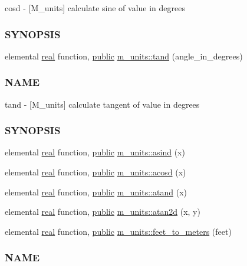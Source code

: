 \begin{DoxyCompactItemize}
\begin{DoxyCompactList}
cosd -\/ \mbox{[}M\+\_\+units\mbox{]} calculate sine of value in degrees \subsubsection*{S\+Y\+N\+O\+P\+S\+IS}\end{DoxyCompactList}\item 
elemental \hyperlink{read__watch_83_8txt_abdb62bde002f38ef75f810d3a905a823}{real} function, \hyperlink{M__stopwatch_83_8txt_a2f74811300c361e53b430611a7d1769f}{public} \hyperlink{namespacem__units_ac2c6550d996061015c6b4178048e4967}{m\+\_\+units\+::tand} (angle\+\_\+in\+\_\+degrees)
\begin{DoxyCompactList}\small\item\em \subsubsection*{N\+A\+ME}

tand -\/ \mbox{[}M\+\_\+units\mbox{]} calculate tangent of value in degrees \subsubsection*{S\+Y\+N\+O\+P\+S\+IS}\end{DoxyCompactList}\item 
elemental \hyperlink{read__watch_83_8txt_abdb62bde002f38ef75f810d3a905a823}{real} function, \hyperlink{M__stopwatch_83_8txt_a2f74811300c361e53b430611a7d1769f}{public} \hyperlink{namespacem__units_ad2b3de1ae68e3090d6c5793fc50dce77}{m\+\_\+units\+::asind} (x)
\item 
elemental \hyperlink{read__watch_83_8txt_abdb62bde002f38ef75f810d3a905a823}{real} function, \hyperlink{M__stopwatch_83_8txt_a2f74811300c361e53b430611a7d1769f}{public} \hyperlink{namespacem__units_af4446b30251a8832b90b9c6c596104d6}{m\+\_\+units\+::acosd} (x)
\item 
elemental \hyperlink{read__watch_83_8txt_abdb62bde002f38ef75f810d3a905a823}{real} function, \hyperlink{M__stopwatch_83_8txt_a2f74811300c361e53b430611a7d1769f}{public} \hyperlink{namespacem__units_ac54e5d4cedc06c56d0de8e0138781be9}{m\+\_\+units\+::atand} (x)
\item 
elemental \hyperlink{read__watch_83_8txt_abdb62bde002f38ef75f810d3a905a823}{real} function, \hyperlink{M__stopwatch_83_8txt_a2f74811300c361e53b430611a7d1769f}{public} \hyperlink{namespacem__units_a09403aaa43be5c74f7b9a3c2df2d1460}{m\+\_\+units\+::atan2d} (x, y)
\item 
elemental \hyperlink{read__watch_83_8txt_abdb62bde002f38ef75f810d3a905a823}{real} function, \hyperlink{M__stopwatch_83_8txt_a2f74811300c361e53b430611a7d1769f}{public} \hyperlink{namespacem__units_a6b2e3302766d3ee6edbb2d6d3c284e96}{m\+\_\+units\+::feet\+\_\+to\+\_\+meters} (feet)
\begin{DoxyCompactList}\small\item\em \subsubsection*{N\+A\+ME}


\end{DoxyCompactList}
\end{DoxyCompactItemize}
